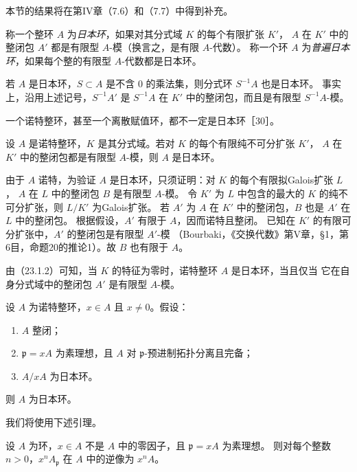 本节的结果将在第IV章（7.6）和（7.7）中得到补充。

称一个整环 $A$ 为\emph{日本环}，如果对其分式域 $K$ 的每个有限扩张 $K'$，
$A$ 在 $K'$ 中的整闭包 $A'$ 都是有限型 $A$-模（换言之，是有限 $A$-代数）。
称一个环 $A$ 为\emph{普遍日本环}，如果每个整的有限型 $A$-代数都是日本环。

若 $A$ 是日本环，$S\subset A$ 是不含 $0$ 的乘法集，则分式环 $S^{-1}A$ 也是日本环。
事实上，沿用上述记号，$S^{-1}A'$ 是 $S^{-1}A$ 在 $K'$ 中的整闭包，而且是有限型 $S^{-1}A$-模。

一个诺特整环，甚至一个离散赋值环，都不一定是日本环［30］。

设 $A$ 是诺特整环，$K$ 是其分式域。若对 $K$ 的每个有限纯不可分扩张 $K'$，
$A$ 在 $K'$ 中的整闭包都是有限型 $A$-模，则 $A$ 是日本环。

\eproof
由于 $A$ 诺特，为验证 $A$ 是日本环，只须证明：对 $K$ 的每个有限拟Galois扩张 $L$，
$A$ 在 $L$ 中的整闭包 $B$ 是有限型 $A$-模。
令 $K'$ 为 $L$ 中包含的最大的 $K$ 的纯不可分扩张，则 $L/K'$ 为Galois扩张。
若 $A'$ 为 $A$ 在 $K'$ 中的整闭包，$B$ 也是 $A'$ 在 $L$ 中的整闭包。
根据假设，$A'$ 有限于 $A$，因而诺特且整闭。
已知在 $K'$ 的有限可分扩张中，$A'$ 的整闭包是有限型 $A'$-模
（Bourbaki，《交换代数》第V章，\S1，第6目，命题20的推论1）。故 $B$ 也有限于 $A$。
\finishproof

由（23.1.2）可知，当 $K$ 的特征为零时，诺特整环 $A$ 是日本环，当且仅当
它在自身分式域中的整闭包 $A'$ 是有限型 $A$-模。

设 $A$ 为诺特整环，$x\in A$ 且 $x\ne0$。假设：
\begin{enumerate}[label=(\roman*)]
\item $A$ 整闭；
\item $\mathfrak p=xA$ 为素理想，且 $A$ 对 $\mathfrak p$-预进制拓扑分离且完备；
\item $A/xA$ 为日本环。
\end{enumerate}
则 $A$ 为日本环。

我们将使用下述引理。

设 $A$ 为环，$x\in A$ 不是 $A$ 中的零因子，且 $\mathfrak p=xA$ 为素理想。
则对每个整数 $n>0$，$x^nA_{\mathfrak p}$ 在 $A$ 中的逆像为 $x^nA$。

